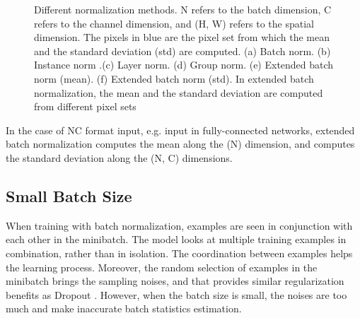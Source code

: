 \documentclass[runningheads]{llncs}
\begin{document}
\begin{figure}[tb]
\centering
\subfigure[BN]{
\label{FIGbnset}
\texttt{[image: bn2]}}
\centering
\subfigure[IN]{
\label{FIGlnset}
\texttt{[image: in2]}}
\centering
\subfigure[LN]{
\label{FIGlnset}
\texttt{[image: ln2]}}
\centering
\subfigure[GN]{
\label{FIGgnset}
\texttt{[image: gn2]}}
\centering
{}
\hspace{.3in}
\centering
{}
\caption{Different normalization methods. N refers to the batch dimension, C refers to the channel dimension, and (H, W) refers to the spatial dimension. The pixels in blue are the pixel set from which the  mean and the standard deviation (std) are computed. (a) Batch norm.  (b) Instance norm .(c) Layer norm. (d) Group norm. (e) Extended batch norm (mean). (f) Extended batch norm (std). In extended batch normalization, the mean and the standard deviation are computed from different pixel sets}
\label{diffnorm}
\end{figure}

In the case of NC format input, e.g. input in fully-connected networks, extended batch normalization computes the mean along the (N) dimension, and computes the standard deviation along the (N, C) dimensions.

\subsection{Small Batch Size}
When training with batch normalization, examples are seen in conjunction with each other in the minibatch. The model looks at multiple training examples in combination, rather than in isolation. The coordination between examples helps the learning process. Moreover, the random selection of examples in the minibatch brings the sampling noises, and that provides similar regularization benefits as Dropout \cite{srivastava2014dropout}. However, when the batch size is small, the noises are too much and make inaccurate batch statistics estimation.
\end{document}
